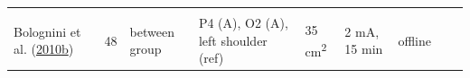 \documentclass[11pt,]{memoir}
\begin{document}
\begin{longtable}[]{@{}lllllllll@{}}
\begin{minipage}[t]{0.12\columnwidth}
\end{minipage} & \begin{minipage}[t]{0.02\columnwidth}\raggedright
\strut
\end{minipage} & \begin{minipage}[t]{0.04\columnwidth}\raggedright
\strut
\end{minipage} & \begin{minipage}[t]{0.11\columnwidth}\raggedright
\strut
\end{minipage} & \begin{minipage}[t]{0.03\columnwidth}\raggedright
\strut
\end{minipage} & \begin{minipage}[t]{0.05\columnwidth}\raggedright
\strut
\end{minipage} & \begin{minipage}[t]{0.05\columnwidth}\raggedright
\strut
\end{minipage} & \begin{minipage}[t]{0.11\columnwidth}\raggedright
\strut
\end{minipage} & \begin{minipage}[t]{0.24\columnwidth}\raggedright
\strut
\end{minipage}\tabularnewline
\begin{minipage}[t]{0.12\columnwidth}\raggedright
Bolognini et al. (\protect\hyperlink{ref-Bolognini2010a}{2010}\protect\hyperlink{ref-Bolognini2010a}{b})\strut
\end{minipage} & \begin{minipage}[t]{0.02\columnwidth}\raggedright
48\strut
\end{minipage} & \begin{minipage}[t]{0.04\columnwidth}\raggedright
between
group\strut
\end{minipage} & \begin{minipage}[t]{0.11\columnwidth}\raggedright
P4 (A), O2 (A), left
shoulder (ref)\strut
\end{minipage} & \begin{minipage}[t]{0.03\columnwidth}\raggedright
35
cm\textsuperscript{2}\strut
\end{minipage} & \begin{minipage}[t]{0.05\columnwidth}\raggedright
2 mA, 15
min\strut
\end{minipage} & \begin{minipage}[t]{0.05\columnwidth}\raggedright
offline\strut
\end{minipage} & \begin{minipage}[t]{0.11\columnwidth}\raggedright

\end{minipage}
\end{longtable}
\end{document}
